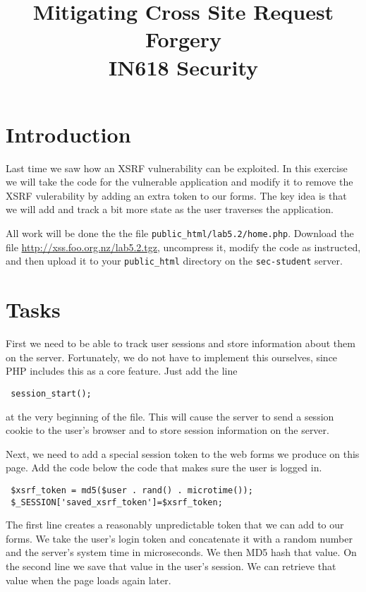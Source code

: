 \documentclass{article}
\begin{document}
\title{Mitigating Cross Site Request Forgery\\ IN618 Security}
\date{}
\maketitle

\section*{Introduction}
Last time we saw how an XSRF vulnerability can be exploited.  In this exercise we will
take the code for the vulnerable application and modify it to remove the XSRF vulerability
by adding an extra token to our forms. The key idea is that we will add and track a bit more
state as the user traverses the application.

All work will be done the the file \texttt{public\_html/lab5.2/home.php}.  Download the file 
\url{http://xss.foo.org.nz/lab5.2.tgz}, uncompress it, modify the code as instructed, and then 
upload it to your \texttt{public\_html} directory on the \texttt{sec-student} server.

\section{Tasks}
First we need to be able to track user sessions and store information about them on the server.
Fortunately, we do not have to implement this ourselves, since PHP includes this as a core feature.
Just add the line

\texttt{ session\_start(); } 

at the very beginning of the file. This will cause the server to send a session cookie
to the user's browser and to store session information on the server.

Next, we need to add a special session token to the web forms we produce on this page. Add the
code below the code that makes sure the user is logged in.

\begin{verbatim}
 $xsrf_token = md5($user . rand() . microtime());
 $_SESSION['saved_xsrf_token']=$xsrf_token;
\end{verbatim}

The first line creates a reasonably unpredictable token that we can add to our forms.  We
take the user's login token and concatenate it with a random number and the server's system
time in microseconds.  We then MD5 hash that value.  On the second line we save that value in
the user's session.  We can retrieve that value when the page loads again later.
\end{document}
